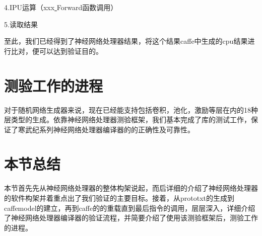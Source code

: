 4.IPU运算（xxx\underline{ }Forward函数调用）

5.读取结果

至此，我们已经得到了神经网络处理器结果，将这个结果caffe中生成的cpu结果进行比对，便可以达到验证目的。
\section{测验工作的进程}
对于随机网络生成器来说，现在已经能支持包括卷积，池化，激励等层在内的18种层类型的生成。依靠神经网络处理器测验框架，我们基本完成了库的测试工作，保证了寒武纪系列神经网络处理器编译器的的正确性及可靠性。
\section{本节总结}
本节首先先从神经网络处理器的整体构架说起，而后详细的介绍了神经网络处理器的软件构架并着重点出了我们验证的主要目标。接着，从prototxt的生成到caffemodel的建立，再到caffe的的重载直到最后指令的调用，层层深入，详细介绍了神经网络处理器编译器的验证流程，并简要介绍了使用该测验框架后，测验工作的进程。
